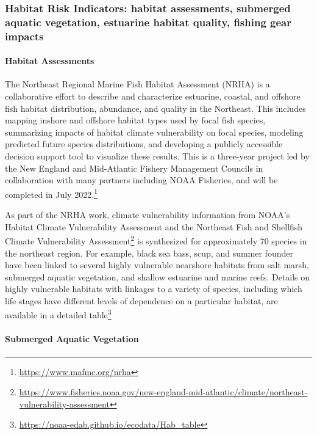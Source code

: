 \documentclass[
  10pt,
]{article}
\begin{document}
\hypertarget{habitat-risk-indicators-habitat-assessments-submerged-aquatic-vegetation-estuarine-habitat-quality-fishing-gear-impacts}{%
\subsubsection{Habitat Risk Indicators: habitat assessments, submerged
aquatic vegetation, estuarine habitat quality, fishing gear
impacts}\label{habitat-risk-indicators-habitat-assessments-submerged-aquatic-vegetation-estuarine-habitat-quality-fishing-gear-impacts}}

\hypertarget{habitat-assessments}{%
\paragraph{Habitat Assessments}\label{habitat-assessments}}

The Northeast Regional Marine Fish Habitat Assessment (NRHA) is a
collaborative effort to describe and characterize estuarine, coastal,
and offshore fish habitat distribution, abundance, and quality in the
Northeast. This includes mapping inshore and offshore habitat types used
by focal fish species, summarizing impacts of habitat climate
vulnerability on focal species, modeling predicted future species
distributions, and developing a publicly accessible decision support
tool to visualize these results. This is a three-year project led by the
New England and Mid-Atlantic Fishery Management Councils in
collaboration with many partners including NOAA Fisheries, and will be
completed in July 2022.\footnote{\url{https://www.mafmc.org/nrha}}

As part of the NRHA work, climate vulnerability information from NOAA's
Habitat Climate Vulnerability Assessment and the Northeast Fish and
Shellfish Climate Vulnerability Assessment\footnote{\url{https://www.fisheries.noaa.gov/new-england-mid-atlantic/climate/northeast-vulnerability-assessment}}
is synthesized for approximately 70 species in the northeast region. For
example, black sea bass, scup, and summer founder have been linked to
several highly vulnerable nearshore habitats from salt marsh, submerged
aquatic vegetation, and shallow estuarine and marine reefs. Details on
highly vulnerable habitats with linkages to a variety of species,
including which life stages have different levels of dependence on a
particular habitat, are available in a detailed table\footnote{\url{https://noaa-edab.github.io/ecodata/Hab_table}}

\hypertarget{submerged-aquatic-vegetation}{%
\paragraph{Submerged Aquatic
Vegetation}\label{submerged-aquatic-vegetation}}
\end{document}
